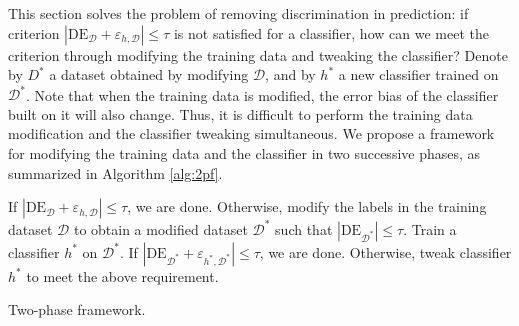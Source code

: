 \documentclass{article}
\begin{document}
This section solves the problem of removing discrimination in prediction: if criterion $\left|\mathrm{DE}_{\mathcal{D}}+\varepsilon_{h,\mathcal{D}}\right| \leq \tau$ is not satisfied for a classifier, how can we meet the criterion through modifying the training data and tweaking the classifier? Denote by $D^{*}$ a dataset obtained by modifying $\mathcal{D}$, and by $h^{*}$ a new classifier trained on $\mathcal{D}^{*}$. Note that when the training data is modified, the error bias of the classifier built on it will also change. Thus, it is difficult to perform the training data modification and the classifier tweaking simultaneous. We propose a framework for modifying the training data and the classifier in two successive phases, as summarized in Algorithm \ref{alg:2pf}.

{
\setlength{\interspacetitleruled}{-.4pt}%
\begin{algorithm}
\SetAlgoVlined
\DontPrintSemicolon
		If $\left| \mathrm{DE}_{\mathcal{D}} \!+\! \varepsilon_{h,\mathcal{D}} \right| \leq \tau$, we are done. Otherwise, modify the labels in the training dataset $\mathcal{D}$ to obtain a modified dataset $\mathcal{D}^{*}$ such that $\left| \mathrm{DE}_{\mathcal{D}^{*}} \right| \leq \tau$. \;
		Train a classifier $h^{*}$ on $\mathcal{D}^{*}$. If $\left| \mathrm{DE}_{\mathcal{D}^{*}} \!+\! \varepsilon_{h^{*},\mathcal{D}^{*}} \right| \leq \tau$, we are done. Otherwise, tweak classifier $h^{*}$ to meet the above requirement.\;
		\caption{Two-phase framework.}
		\label{alg:2pf}	
\end{algorithm}
}
\end{document}
